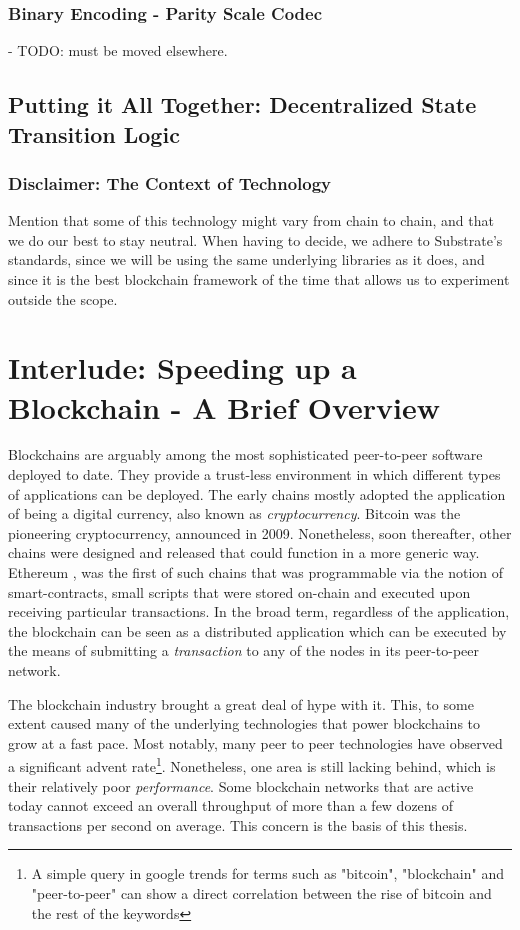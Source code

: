 \subsubsection{Binary Encoding - Parity Scale Codec}

- TODO: must be moved elsewhere.

\subsection{Putting it All Together: Decentralized State Transition Logic}

\subsubsection{Disclaimer: The Context of Technology}

Mention that some of this technology might vary from chain to chain, and that we do our best to stay
neutral. When having to decide, we adhere to Substrate's standards, since we will be using the same
underlying libraries as it does, and since it is the best blockchain framework of the time that
allows us to experiment outside the scope.

\section{Interlude: Speeding up a Blockchain - A Brief Overview} \label{chap_bg:sec:ways_to_speedup}

Blockchains are arguably among the most sophisticated peer-to-peer software deployed to date. They
provide a trust-less environment in which different types of applications can be deployed. The early
chains mostly adopted the application of being a digital currency, also known as
\textit{cryptocurrency}. Bitcoin \cite{Nakamoto} was the pioneering cryptocurrency, announced in
2009. Nonetheless, soon thereafter, other chains were designed and released that could function in a
more generic way. Ethereum \cite{etherwhite}, was the first of such chains that was programmable via
the notion of smart-contracts, small scripts that were stored on-chain and executed upon receiving
particular transactions. In the broad term, regardless of the application, the blockchain can be
seen as a distributed application which can be executed by the means of submitting a
\textit{transaction} to any of the nodes in its peer-to-peer network.

The blockchain industry brought a great deal of hype with it. This, to some extent caused many of
the underlying technologies that power blockchains to grow at a fast pace. Most notably, many peer
to peer technologies have observed a significant advent rate\footnote{A simple query in google
trends for terms such as "bitcoin", "blockchain" and "peer-to-peer" can show a direct correlation
between the rise of bitcoin and the rest of the keywords}. Nonetheless, one area is still lacking
behind, which is their relatively poor \textit{performance}. Some blockchain networks that are
active today cannot exceed an overall throughput of more than a few dozens of transactions per
second on average. This concern is the basis of this thesis.

